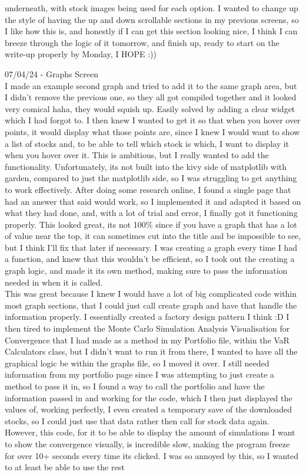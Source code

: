 \documentclass{article}
\begin{document}
underneath, with stock images being used for each option. I wanted to change up the style of having the up and down scrollable sections in my previous screens, so I like how this is, and honestly if I can get this section looking nice, I think I can breeze through the logic of it tomorrow, and finish up, ready to start on the write-up properly by Monday, I HOPE :))\\\vspace{0.3cm}

07/04/24 - Graphs Screen\\
I made an example second graph and tried to add it to the same graph area, but I didn't remove the previous one, so they all got compiled together and it looked very comical haha, they would squish up. Easily solved by adding a clear widget which I had forgot to. I then knew I wanted to get it so that when you hover over points, it would display what those points are, since I knew I would want to show a list of stocks and, to be able to tell which stock is which, I want to display it when you hover over it. This is ambitious, but I really wanted to add the functionality. Unfortunately, its not built into the kivy side of matplotlib with garden, compared to just the matplotlib side, so I was struggling to get anything to work effectively. After doing some research online, I found a single page that had an answer that said would work, so I implemented it and adapted it based on what they had done, and, with a lot of trial and error, I finally got it functioning properly. This looked great, its not 100\% since if you have a graph that has a lot of value near the top, it can sometimes cut into the title and be impossible to see, but I think I'll fix that later if necessary. I was creating a graph every time I had a function, and knew that this wouldn't be efficient, so I took out the creating a graph logic, and made it its own method, making sure to pass the information needed in when it is called. \\This was great because I knew I would have a lot of big complicated code within most graph sections, that I could just call create graph and have that handle the information properly. I essentially created a factory design pattern I think :D I then tired to implement the Monte Carlo Simulation Analysis Visualisation for Convergence that I had made as a method in my Portfolio file, within the VaR Calculators class, but I didn't want to run it from there, I wanted to have all the graphical logic be within the graphs file, so I moved it over. I still needed information from my portfolio page since I was attempting to just create a method to pass it in, so I found a way to call the portfolio and have the information passed in and working for the code, which I then just displayed the values of, working perfectly, I even created a temporary save of the downloaded stocks, so I could just use that data rather then call for stock data again. However, this code, for it to be able to display the amount of simulations I want to show the convergence visually, is incredible slow, making the program freeze for over 10+ seconds every time its clicked. I was so annoyed by this, so I wanted to at least be able to use the rest 
\end{document}
